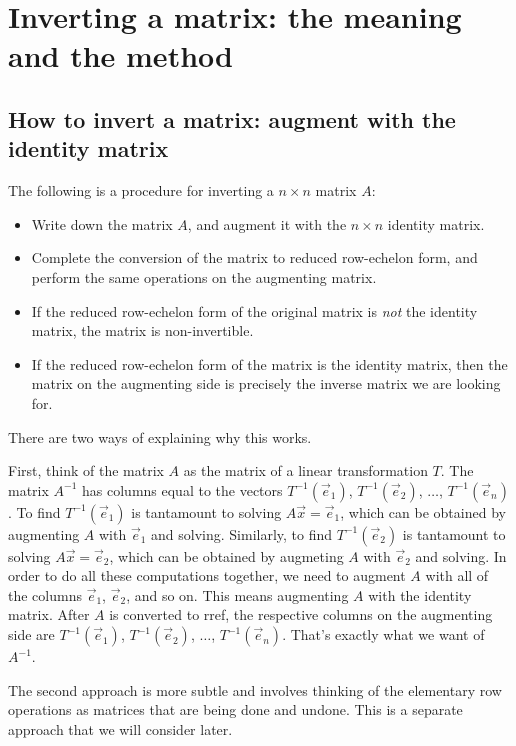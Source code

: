 \documentclass[10pt]{amsart}
\begin{document}
\vspace{0.2in}
\section{Inverting a matrix: the meaning and the method}

\subsection{How to invert a matrix: augment with the identity matrix}

The following is a procedure for inverting a $n \times n$ matrix $A$:

\begin{itemize}
\item Write down the matrix $A$, and augment it with the $n \times n$
  identity matrix.
\item Complete the conversion of the matrix to reduced row-echelon
  form, and perform the same operations on the augmenting matrix.
\item If the reduced row-echelon form of the original matrix is {\em
  not} the identity matrix, the matrix is non-invertible.
\item If the reduced row-echelon form of the matrix is the identity
  matrix, then the matrix on the augmenting side is precisely the
  inverse matrix we are looking for.
\end{itemize}

There are two ways of explaining why this works.

First, think of the matrix $A$ as the matrix of a linear
transformation $T$. The matrix $A^{-1}$ has columns equal to the
vectors $T^{-1}(\vec{e}_1)$, $T^{-1}(\vec{e}_2)$, $\dots$,
$T^{-1}(\vec{e}_n)$. To find $T^{-1}(\vec{e}_1)$ is tantamount to
solving $A\vec{x} = \vec{e}_1$, which can be obtained by augmenting
$A$ with $\vec{e}_1$ and solving. Similarly, to find
$T^{-1}(\vec{e}_2)$ is tantamount to solving $A\vec{x} = \vec{e}_2$,
which can be obtained by augmeting $A$ with $\vec{e}_2$ and
solving. In order to do all these computations together, we need to
augment $A$ with all of the columns $\vec{e}_1$, $\vec{e}_2$, and so
on. This means augmenting $A$ with the identity matrix. After $A$ is
converted to rref, the respective columns on the augmenting side are
$T^{-1}(\vec{e}_1)$, $T^{-1}(\vec{e}_2)$, $\dots$,
$T^{-1}(\vec{e}_n)$. That's exactly what we want of $A^{-1}$.

The second approach is more subtle and involves thinking of the
elementary row operations as matrices that are being done and
undone. This is a separate approach that we will consider later.
\end{document}
